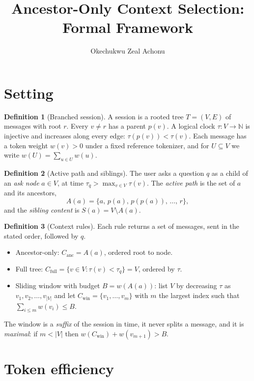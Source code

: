 \documentclass[11pt]{article}
\title{Ancestor-Only Context Selection: Formal Framework}
\author{Okechukwu Zeal Achonu}
\date{}
\theoremstyle{definition}
\newtheorem{definition}{Definition}
\theoremstyle{remark}
\newcommand{\A}{A(a)}
\newcommand{\Sib}{S(a)}
\newcommand{\w}{w}
\newcommand{\anc}{\mathrm{anc}}
\newcommand{\full}{\mathrm{full}}
\newcommand{\win}{\mathrm{win}}
\begin{document}
\maketitle

\section{Setting}

\begin{definition}[Branched session]
A session is a rooted tree $T=(V,E)$ of messages with root $r$. Every
$v\neq r$ has a parent $p(v)$. A logical clock $\tau:V\to\mathbb{N}$ is
injective and increases along every edge: $\tau(p(v))<\tau(v)$. Each message
has a token weight $\w(v)>0$ under a fixed reference tokenizer, and for
$U\subseteq V$ we write $\w(U)=\sum_{u\in U}\w(u)$.
\end{definition}

\begin{definition}[Active path and siblings]
The user asks a question $q$ as a child of an \emph{ask node} $a\in V$, at time
$\tau_q>\max_{v\in V}\tau(v)$. The \emph{active path} is the set of $a$ and
its ancestors,
\[
  \A=\{a,\,p(a),\,p(p(a)),\,\dots,\,r\},
\]
and the \emph{sibling content} is $\Sib=V\setminus\A$.
\end{definition}

\begin{definition}[Context rules]
Each rule returns a set of messages, sent in the stated order, followed by $q$.
\begin{itemize}
  \item Ancestor-only: $C_\anc=\A$, ordered root to node.
  \item Full tree: $C_\full=\{v\in V:\tau(v)<\tau_q\}=V$, ordered by $\tau$.
  \item Sliding window with budget $B=\w(\A)$: list $V$ by decreasing $\tau$ as
        $v_1,v_2,\dots,v_{|V|}$ and let $C_\win=\{v_1,\dots,v_m\}$ with $m$ the
        largest index such that $\sum_{i\le m}\w(v_i)\le B$.
\end{itemize}
The window is a \emph{suffix} of the session in time, it never splits a
message, and it is \emph{maximal}: if $m<|V|$ then $\w(C_\win)+\w(v_{m+1})>B$.
\end{definition}

\section{Token efficiency}
\end{document}
